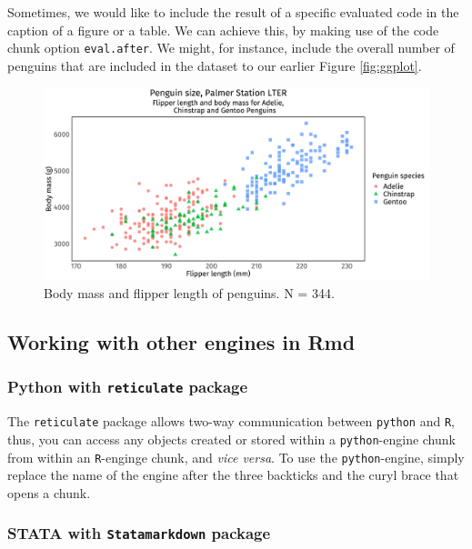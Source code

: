 \documentclass[
  11pt,
]{scrartcl}
\begin{document}
Sometimes, we would like to include the result of a specific evaluated code in the caption of a figure or a table. We can achieve this, by making use of the code chunk option \texttt{eval.after}. We might, for instance, include the overall number of penguins that are included in the dataset to our earlier Figure \ref{fig:ggplot}.

\begin{figure}

{\centering \includegraphics[width=0.9\linewidth]{figs/figlit-prog-caption-1} 

}

\caption{Body mass and flipper length of penguins. N = 344.}\label{fig:lit-prog-caption}
\end{figure}

\hypertarget{working-with-other-engines-in-rmd}{%
\subsection{Working with other engines in Rmd}\label{working-with-other-engines-in-rmd}}

\hypertarget{python-with-reticulate-package}{%
\subsubsection{\texorpdfstring{Python with \texttt{reticulate} package}{Python with reticulate package}}\label{python-with-reticulate-package}}

The \texttt{reticulate} package allows two-way communication between \texttt{python} and \texttt{R}, thus, you can access any objects created or stored within a \texttt{python}-engine chunk from within an \texttt{R}-enginge chunk, and \emph{vice versa}. To use the \texttt{python}-engine, simply replace the name of the engine after the three backticks and the curyl brace that opens a chunk.

\hypertarget{stata-with-statamarkdown-package}{%
\subsubsection{\texorpdfstring{STATA with \texttt{Statamarkdown} package}{STATA with Statamarkdown package}}\label{stata-with-statamarkdown-package}}
\end{document}
